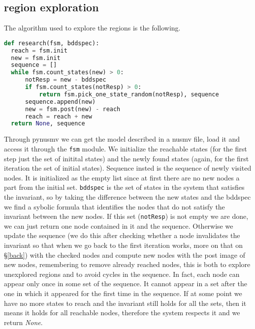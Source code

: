 \documentclass[9pt,oneside]{amsart}
\begin{document}
\begin{multicols}{2}
\section{region exploration}\label{explore}
The algorithm used to explore the regions is the following.
\begin{lstlisting}[language=Python]
def research(fsm, bddspec):
  reach = fsm.init
  new = fsm.init
  sequence = []
  while fsm.count_states(new) > 0:
      notResp = new - bddspec
      if fsm.count_states(notResp) > 0:
          return fsm.pick_one_state_random(notResp), sequence
      sequence.append(new)
      new = fsm.post(new) - reach
      reach = reach + new
  return None, sequence
\end{lstlisting}\label{code:reachable}
Through pynusmv we can get the model described in a nusmv file, load it
and access it through the \texttt{fsm} module. We initialize the
reachable states (for the first step just the set of initital states)
and the newly found states (again, for the first iteration the set of
initial states). Sequence insted is the sequence of newly visited
nodes. It is initialized as the empty list since at first there are no
new nodes a part from the initial set. \texttt{bddspec} is the set of
states in the system that satisfies the invariant, so by taking the
difference between the new states and the bddspec we find a sybolic
formula that identifies the nodes that do not satisfy the invariant
between the new nodes. If this set (\texttt{notResp}) is not empty we
are done, we can just return one node contained in it and the sequence.
Otherwise we update the sequence (we do this after checking
whether a node invalidates the invariant so that when we go back to the
first iteration works, more on that on \S\ref{back}) with the checked
nodes and compute new nodes with the post image of new nodes,
remembering to remove already reached nodes, this is both to explore
unexplored regions and to avoid cycles in the sequence. In fact, each
node can appear only once in some set of the sequence. It cannot
appear in a set after the one in which it appeared for the first time
in the sequence. If at some point we have no more states to reach and
the invariant still holds for all the sets, then it means it holds for
all reachable nodes, therefore the system respects it and we return \textit{None}.


\end{multicols}
\end{document}
